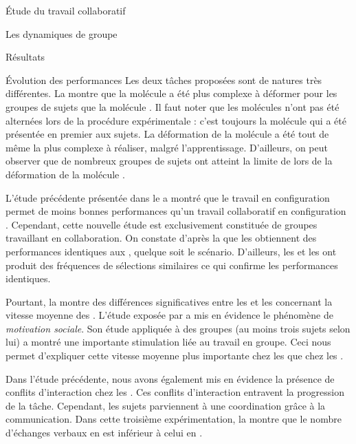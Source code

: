 \documentclass[myfrancais]{mythesis}
\begin{document}
\begin{mypart}{Étude du travail collaboratif}
\begin{mychapter}{Les dynamiques de groupe}
\begin{mysection}{Résultats}
\begin{mysubsection}{Évolution des performances}
					Les deux tâches proposées sont de natures très différentes.
					La  montre que la molécule \myUbiquitin a été plus complexe à déformer pour les groupes de sujets que la molécule \myPrion.
					Il faut noter que les molécules n'ont pas été alternées lors de la procédure expérimentale  : c'est toujours la molécule \myPrion qui a été présentée en premier aux sujets.
					La déformation de la molécule \myUbiquitin a été tout de même la plus complexe à réaliser, malgré l'apprentissage.
					D'ailleurs, on peut observer que de nombreux groupes de sujets ont atteint la limite de  lors de la déformation de la molécule \myUbiquitin.

					L'étude précédente présentée dans le  a montré que le travail en configuration  permet de moins bonnes performances qu'un travail collaboratif en configuration .
					Cependant, cette nouvelle étude est exclusivement constituée de groupes travaillant en collaboration.
					On constate d'après la  que les  obtiennent des performances identiques aux , quelque soit le scénario.
					D'ailleurs, les  et les  ont produit des fréquences de sélections similaires ce qui confirme les performances identiques.

					Pourtant, la  montre des différences significatives entre les  et les  concernant la vitesse moyenne des .
					L'étude exposée par  a mis en évidence le phénomène de \emph{motivation sociale}.
					Son étude appliquée à des groupes (au moins trois sujets selon lui) a montré une importante stimulation liée au travail en groupe.
					Ceci nous permet d'expliquer cette vitesse moyenne plus importante chez les  que chez les .

					Dans l'étude précédente, nous avons également mis en évidence la présence de conflits d'interaction chez les .
					Ces conflits d'interaction entravent la progression de la tâche.
					Cependant, les sujets parviennent à une coordination grâce à la communication.
					Dans cette troisième expérimentation, la  montre que le nombre d'échanges verbaux en  est inférieur à celui en .


\end{mysubsection}
\end{mysection}
\end{mychapter}
\end{mypart}
\end{document}
